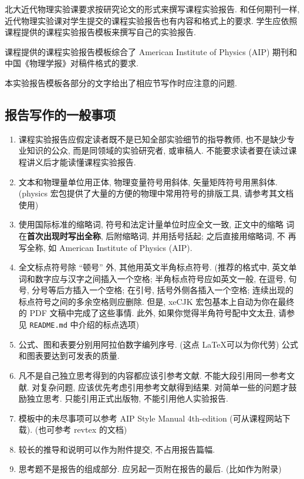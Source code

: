 \documentclass[font=notofandol]{mpltx}
\newcommand{\note}[1]{{\color{gray}#1}}
\begin{document}
北大近代物理实验课要求按研究论文的形式来撰写课程实验报告.
和任何期刊一样, 近代物理实验课对学生提交的课程实验报告也有内容和格式上的要求.
学生应依照课程提供的课程实验报告模板来撰写自己的实验报告.

课程提供的课程实验报告模板综合了 American Institute of Physics (AIP) 期刊和中国《物理学报》对稿件格式的要求.

本实验报告模板各部分的文字给出了相应节写作时应注意的问题.

\subsection*{报告写作的一般事项}

\begin{enumerate}
    \item 课程实验报告应假定读者既不是已知全部实验细节的指导教师, 也不是缺少专业知识的公众, 而是同领域的实验研究者, 或审稿人.
          不能要求读者要在读过课程讲义后才能读懂课程实验报告.
    \item 文本和物理量单位用正体, 物理变量符号用斜体, 矢量矩阵符号用黑斜体.
          \note{(\textsf{physics} 宏包提供了大量的方便的物理中常用符号的排版工具, 请参考其文档使用)}
    \item 使用国际标准的缩略词, 符号和法定计量单位时应全文一致, 正文中的缩略
          词在\textbf{首次出现时写出全称}, 后附缩略词, 并用括号括起; 之后直接用缩略词, 不
          再写全称, 如 American Institute of Physics (AIP).
    \item 全文标点符号除 ``顿号'' 外, 其他用英文半角标点符号.
          \note{(推荐的格式中, 英文单词和数字应与汉字之间插入一个空格;
              半角标点符号应如英文一般, 在逗号, 句号, 分号等后方插入一个空格;
              在引号, 括号外侧各插入一个空格;
              连续出现的标点符号之间的多余空格则应删除.
              但是, \textsf{xeCJK} 宏包基本上自动为你在最终的 PDF 文稿中完成了这些事情.
              此外, 如果你觉得半角符号配中文太丑, 请参见 \texttt{README.md} 中介绍的标点选项)}
    \item 公式、图和表要分别用阿拉伯数字编列序号. \note{(这点 \LaTeX 可以为你代劳)}
          公式和图表要达到可发表的质量.
    \item 凡不是自己独立思考得到的内容都应该引参考文献.
          不能大段引用同一参考文献.
          对复杂问题, 应该优先考虑引用参考文献得到结果.
          对简单一些的问题才鼓励独立思考.
          只能引用正式出版物, 不能引用他人实验报告.
    \item 模板中的未尽事项可以参考 AIP Style Manual 4th-edition (可从课程网站下载).
          \note{(也可参考 \textsf{revtex} 的文档)}
    \item 较长的推导和说明可以作为附件提交, 不占用报告篇幅.
    \item 思考题不是报告的组成部分.
          应另起一页附在报告的最后. \note{(比如作为附录)}
\end{enumerate}
\end{document}
